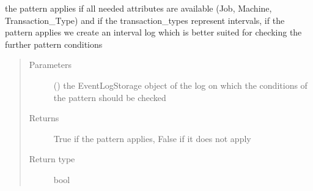 \documentclass[letterpaper,10pt,english]{sphinxmanual}
\begin{document}
\begin{fulllineitems}
\begin{fulllineitems}
\label{\detokenize{event_log_analyzer:event_log_analyzer.pattern_library.manufacturing_scheduling_patterns.ManufacturingScheduling.pattern_applies}}
\sphinxAtStartPar
the pattern applies if all needed attributes are available (Job, Machine, Transaction\_Type) and if the transaction\_types represent intervals,
if the pattern applies we create an interval log which is better suited for checking the further pattern conditions
\begin{quote}\begin{description}
\item[{Parameters}] \leavevmode
\sphinxAtStartPar
{} ({\hyperref[\detokenize{event_log_analyzer:event_log_analyzer.event_log.EventLogStorage}]{}}) \textendash{} the EventLogStorage object of the log on which the conditions of the pattern should be checked

\item[{Returns}] \leavevmode
\sphinxAtStartPar
True if the pattern applies, False if it does not apply

\item[{Return type}] \leavevmode
\sphinxAtStartPar
bool

\end{description}\end{quote}

\end{fulllineitems}


\end{fulllineitems}

\end{document}
